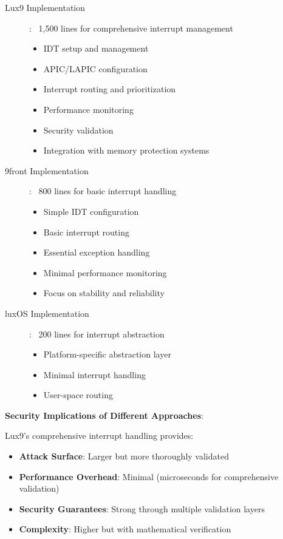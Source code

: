 \documentclass[11pt,letterpaper]{article}
\begin{document}
\begin{description}
\item[Lux9 Implementation]: ~1,500 lines for comprehensive interrupt management
  \begin{itemize}
  \item IDT setup and management
  \item APIC/LAPIC configuration
  \item Interrupt routing and prioritization
  \item Performance monitoring
  \item Security validation
  \item Integration with memory protection systems
  \end{itemize}

\item[9front Implementation]: ~800 lines for basic interrupt handling
  \begin{itemize}
  \item Simple IDT configuration
  \item Basic interrupt routing
  \item Essential exception handling
  \item Minimal performance monitoring
  \item Focus on stability and reliability
  \end{itemize}

\item[luxOS Implementation]: ~200 lines for interrupt abstraction
  \begin{itemize}
  \item Platform-specific abstraction layer
  \item Minimal interrupt handling
  \item User-space routing
  \end{itemize}
\end{description}

\textbf{Security Implications of Different Approaches}:

Lux9's comprehensive interrupt handling provides:
\begin{itemize}
\item \textbf{Attack Surface}: Larger but more thoroughly validated
\item \textbf{Performance Overhead}: Minimal (microseconds for comprehensive validation)
\item \textbf{Security Guarantees}: Strong through multiple validation layers
\item \textbf{Complexity}: Higher but with mathematical verification
\end{itemize}
\end{document}
